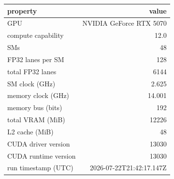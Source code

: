 \begin{tabular}{lr}
\toprule
property & value \\
\midrule
GPU & NVIDIA GeForce RTX 5070 \\
compute capability & 12.0 \\
SMs & 48 \\
FP32 lanes per SM & 128 \\
total FP32 lanes & 6144 \\
SM clock (GHz) & 2.625 \\
memory clock (GHz) & 14.001 \\
memory bus (bits) & 192 \\
total VRAM (MiB) & 12226 \\
L2 cache (MiB) & 48 \\
CUDA driver version & 13030 \\
CUDA runtime version & 13030 \\
run timestamp (UTC) & 2026-07-22T21:42:17.147Z \\
\bottomrule
\end{tabular}
